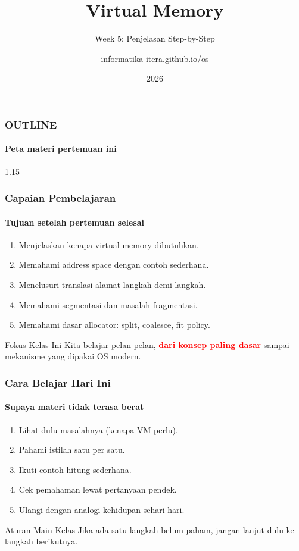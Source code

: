 \documentclass[t,aspectratio=169,xcolor=dvipsnames]{beamer}
\title[Virtual Memory]{Virtual Memory}
\subtitle{Week 5: Penjelasan Step-by-Step}
\author[informatika-itera.github.io/os]{informatika-itera.github.io/os}
\institute[ITERA]{Program Studi Teknik Informatika \\ Institut Teknologi Sumatera}
\date{\textcolor{nyublue}{2026}}
\newcommand{\tem}[1]{\textbf{\textcolor{red}{#1}}}
\begin{document}
\begin{frame}
    \titlepage
\end{frame}

\begin{frame}
    \frametitle{OUTLINE}
    \framesubtitle{Peta materi pertemuan ini}
    \small
    \begin{spacing}{1.15}
        \tableofcontents
    \end{spacing}
\end{frame}

\begin{frame}
    \frametitle{Capaian Pembelajaran}
    \framesubtitle{Tujuan setelah pertemuan selesai}
    \small
    \begin{enumerate}
        \item Menjelaskan kenapa virtual memory dibutuhkan.
        \item Memahami address space dengan contoh sederhana.
        \item Menelusuri translasi alamat langkah demi langkah.
        \item Memahami segmentasi dan masalah fragmentasi.
        \item Memahami dasar allocator: split, coalesce, fit policy.
    \end{enumerate}
    \begin{exampleblock}{Fokus Kelas Ini}
        Kita belajar pelan-pelan, \tem{dari konsep paling dasar} sampai mekanisme yang dipakai OS modern.
    \end{exampleblock}
\end{frame}

\begin{frame}
    \frametitle{Cara Belajar Hari Ini}
    \framesubtitle{Supaya materi tidak terasa berat}
    \small
    \begin{enumerate}
        \item Lihat dulu masalahnya (kenapa VM perlu).
        \item Pahami istilah satu per satu.
        \item Ikuti contoh hitung sederhana.
        \item Cek pemahaman lewat pertanyaan pendek.
        \item Ulangi dengan analogi kehidupan sehari-hari.
    \end{enumerate}
    \begin{alertblock}{Aturan Main Kelas}
        Jika ada satu langkah belum paham, jangan lanjut dulu ke langkah berikutnya.
    \end{alertblock}
\end{frame}
\end{document}
